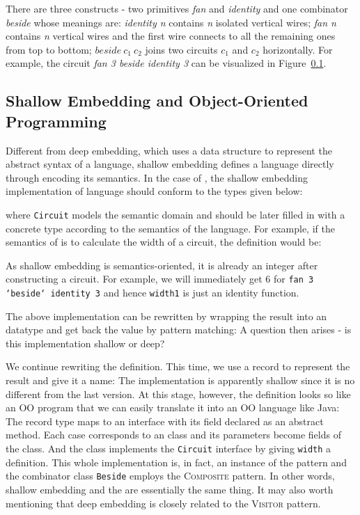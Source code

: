 There are three constructs - two primitives
\emph{fan} and \emph{identity} and one combinator \emph{beside} whose
meanings are: \emph{identity n} contains \emph{n} isolated vertical wires;
\emph{fan n} contains \emph{n} vertical wires and the first wire connects to
all the remaining ones from top to bottom; $beside\ c_1\ c_2$ joins two circuits
$c_1$ and $c_2$ horizontally.
For example, the circuit \emph{fan 3 beside identity 3} can be visualized in Figure~\ref{}.

\subsection{Shallow Embedding and Object-Oriented Programming}
Different from deep embedding, which uses a data structure to represent the
abstract syntax of a language, shallow embedding defines a language
directly through encoding its semantics. In the case of \dsl,
the shallow embedding implementation of language should conform to the types given below:

where \texttt{Circuit} models the semantic domain and should be later filled in with a
concrete type according to the semantics of the language.
For example, if the semantics of \dsl is to calculate the width of a
circuit, the definition would be:

As shallow embedding is semantics-oriented, it is already an integer after
constructing a circuit. For example, we will immediately get $6$ for
\texttt{fan 3 `beside` identity 3} and hence \texttt{width1} is just an identity function.

The above implementation can be rewritten by wrapping the result into an
datatype and get back the value by pattern matching:
A question then arises - is this implementation shallow or deep?

We continue rewriting the definition. This time, we use a record to represent
the result and give it a name:
The implementation is apparently shallow since it is no different from the last version.
At this stage, however, the definition looks so like an OO program that we can easily
translate it into an OO language like Java:
The record type maps to an interface with its field declared as an abstract method.
Each case corresponds to an class and its parameters become fields of the class.
And the class implements the \texttt{Circuit} interface by giving \texttt{width}
a definition. This whole implementation is, in fact, an instance of the \interp
pattern and the combinator class \texttt{Beside} employs the \textsc{Composite} pattern.
In other words, shallow embedding and the \interp are essentially the same thing.
It may also worth mentioning that deep embedding is closely related to the
\textsc{Visitor} pattern.

